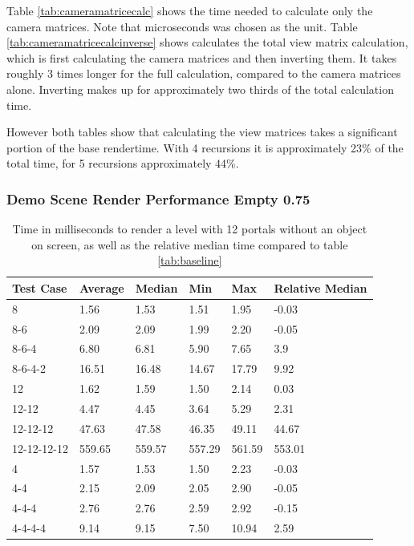 Table \ref{tab:cameramatricecalc} shows the time needed to calculate only the camera matrices. Note that microseconds was chosen as the unit. Table \ref{tab:cameramatricecalcinverse} shows calculates the total view matrix calculation, which is first calculating the camera matrices and then inverting them. It takes roughly 3 times longer for the full calculation, compared to the camera matrices alone. Inverting makes up for approximately two thirds of the total calculation time.

However both tables show that calculating the view matrices takes a significant portion of the base rendertime. With 4 recursions it is approximately 23\% of the total time, for 5 recursions approximately 44\%.

\subsubsection{Demo Scene Render Performance Empty 0.75}


\begin{table}[H]
	\label{tab:rendernothing}
	\begin{tabular}{|l|l|l|l|l|l|}
		\hline
		Test Case   & Average & Median & Min    & Max    & Relative Median \\ \hline
		8           & 1.56    & 1.53   & 1.51   & 1.95   & -0.03           \\ \hline
		8-6         & 2.09    & 2.09   & 1.99   & 2.20   & -0.05           \\ \hline
		8-6-4       & 6.80    & 6.81   & 5.90   & 7.65   & 3.9             \\ \hline
		8-6-4-2     & 16.51   & 16.48  & 14.67  & 17.79  & 9.92            \\ \hline
		12          & 1.62    & 1.59   & 1.50   & 2.14   & 0.03            \\ \hline
		12-12       & 4.47    & 4.45   & 3.64   & 5.29   & 2.31            \\ \hline
		12-12-12    & 47.63   & 47.58  & 46.35  & 49.11  & 44.67           \\ \hline
		12-12-12-12 & 559.65  & 559.57 & 557.29 & 561.59 & 553.01          \\ \hline
		4           & 1.57    & 1.53   & 1.50   & 2.23   & -0.03           \\ \hline
		4-4         & 2.15    & 2.09   & 2.05   & 2.90   & -0.05           \\ \hline
		4-4-4       & 2.76    & 2.76   & 2.59   & 2.92   & -0.15           \\ \hline
		4-4-4-4     & 9.14    & 9.15   & 7.50   & 10.94  & 2.59            \\ \hline
	\end{tabular}
	\caption{Time in milliseconds to render a level with 12 portals without an object on screen, as well as the relative median time compared to table \ref{tab:baseline}}
\end{table}


